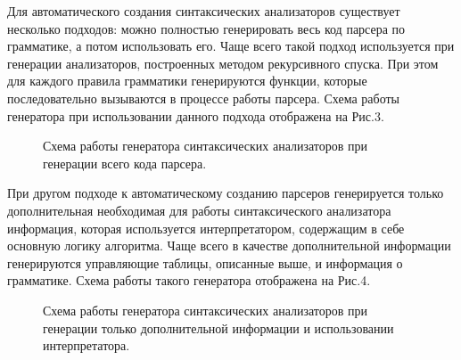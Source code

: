 \documentclass{matmex-diploma-custom}
\begin{document}
Для автоматического создания синтаксических анализаторов существует несколько подходов: можно полностью генерировать весь код парсера по грамматике, а потом использовать его. Чаще всего такой подход используется при генерации анализаторов, построенных методом рекурсивного спуска. При этом для каждого правила грамматики генерируются функции, которые последовательно вызываются в процессе работы парсера. Схема работы генератора при использовании данного подхода отображена на Рис.3.

\begin{figure}[h]
\caption{Схема работы генератора синтаксических анализаторов при генерации всего кода парсера.}
\label{fig3}
\end{figure}

При другом подходе к автоматическому созданию парсеров генерируется только дополнительная необходимая для работы синтаксического анализатора информация, которая используется интерпретатором, содержащим в себе основную логику алгоритма. Чаще всего в качестве дополнительной информации генерируются управляющие таблицы, описанные выше, и информация о грамматике. Схема работы такого генератора отображена на Рис.4.

\begin{figure}[h]
\caption{Схема работы генератора синтаксических анализаторов при генерации только дополнительной информации и использовании интерпретатора.}
\label{fig4}
\end{figure} 
\end{document}
